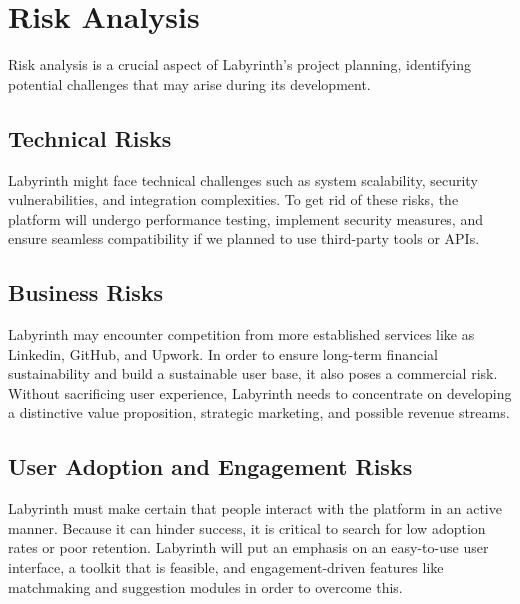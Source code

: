 \documentclass{FastFyp}
\begin{document}
\begin{table}[h]
    \centering
    \caption{Analytics Table}
    \renewcommand{\arraystretch}{1.2}
    \setlength{\tabcolsep}{5pt}
    \small
\end{table}
\FloatBarrier
\section{ Risk Analysis}
Risk analysis is a crucial aspect of Labyrinth’s project planning, identifying potential challenges that may arise during its development. 
\subsection{Technical Risks}
Labyrinth might face technical challenges such as system scalability, security vulnerabilities, and integration complexities. To get rid of these risks, the platform will undergo performance testing, implement security measures, and ensure seamless compatibility if we planned to use third-party tools or APIs.
\subsection{Business Risks}
Labyrinth may encounter competition from more established services like as Linkedin, GitHub, and Upwork.  In order to ensure long-term financial sustainability and build a sustainable user base, it also poses a commercial risk.  Without sacrificing user experience, Labyrinth needs to concentrate on developing a distinctive value proposition, strategic marketing, and possible revenue streams.
\subsection{User Adoption and Engagement Risks}
Labyrinth must make certain that people interact with the platform in an active manner.  Because it can hinder success, it is critical to search for low adoption rates or poor retention.  Labyrinth will put an emphasis on an easy-to-use user interface, a toolkit that is feasible, and engagement-driven features like matchmaking and suggestion modules in order to overcome this.
\end{document}
